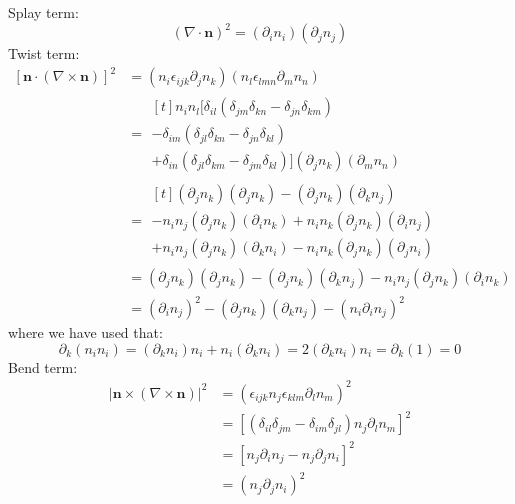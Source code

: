 \documentclass[reqno]{article}
\begin{document}
\noindent
Splay term:
\begin{equation}
    (\nabla \cdot \mathbf{n})^2 = (\partial_i n_i) (\partial_j n_j)
\end{equation}
Twist term:
\begin{equation}
\begin{split}
    \left[ \mathbf{n} \cdot (\nabla \times \mathbf{n}) \right]^2
    &=
    (n_i \epsilon_{ijk} \partial_j n_k) (n_l \epsilon_{lmn} \partial_m n_n) \\
    &=
    \begin{multlined}[t]
    n_i n_l 
    \bigl[ 
    \delta_{il} (\delta_{jm} \delta_{kn} - \delta_{jn} \delta_{km}) \\
    - \delta_{im}(\delta_{jl} \delta_{kn} - \delta_{jn} \delta_{kl}) \\
    + \delta_{in} (\delta_{jl} \delta_{km} - \delta_{jm} \delta_{kl})
    \bigr]
    (\partial_j n_k) (\partial_m n_n)
    \end{multlined} \\
    &= 
    \begin{multlined}[t]
        (\partial_j n_k)(\partial_j n_k) - (\partial_j n_k) (\partial_k n_j) \\
        - n_i n_j (\partial_j n_k) (\partial_i n_k) + n_i n_k (\partial_j n_k) (\partial_i n_j) \\
        + n_i n_j (\partial_j n_k) (\partial_k n_i) - n_i n_k (\partial_j n_k) (\partial_j n_i)
    \end{multlined} \\
    &= 
    (\partial_j n_k)(\partial_j n_k) 
    - (\partial_j n_k) (\partial_k n_j)
    - n_i n_j (\partial_j n_k) (\partial_i n_k) \\
    &=
    (\partial_i n_j)^2
    - (\partial_j n_k) (\partial_k n_j)
    - (n_i \partial_i n_j)^2
\end{split}
\end{equation}
where we have used that:
\begin{equation}
    \partial_k (n_i n_i)
    =
    (\partial_k n_i) n_i
    + n_i (\partial_k n_i)
    =
    2 (\partial_k n_i) n_i
    =
    \partial_k (1)
    =
    0
\end{equation}
Bend term:
\begin{equation}
\begin{split}
    \left| \mathbf{n} \times (\nabla \times \mathbf{n}) \right|^2
    &=
    (\epsilon_{ijk} n_j \epsilon_{klm} \partial_l n_m)^2 \\
    &=
    \left[(\delta_{il} \delta_{jm} - \delta_{im} \delta_{jl}) n_j \partial_l n_m \right]^2 \\
    &= 
    \left[n_j \partial_i n_j - n_j \partial_j n_i\right]^2 \\
    &= (n_j \partial_j n_i)^2
\end{split}
\end{equation}
\end{document}
